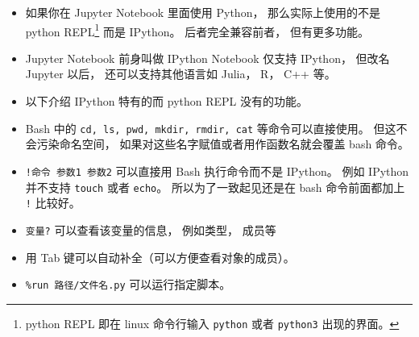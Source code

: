 
\begin{issues}
\issueDraft
\end{issues}

\begin{itemize}
\item 如果你在 Jupyter Notebook 里面使用 Python， 那么实际上使用的不是 python REPL\footnote{python REPL 即在 linux 命令行输入 \verb|python| 或者 \verb|python3| 出现的界面。} 而是 IPython。 后者完全兼容前者， 但有更多功能。
\item Jupyter Notebook 前身叫做 IPython Notebook 仅支持 IPython， 但改名 Jupyter 以后， 还可以支持其他语言如 Julia， R， C++ 等。
\item 以下介绍 IPython 特有的而 python REPL 没有的功能。
\item Bash 中的 \verb|cd, ls, pwd, mkdir, rmdir, cat| 等命令可以直接使用。 但这不会污染命名空间， 如果对这些名字赋值或者用作函数名就会覆盖 bash 命令。
\item \verb|!命令 参数1 参数2| 可以直接用 Bash 执行命令而不是 IPython。 例如 IPython 并不支持 \verb|touch| 或者 \verb|echo|。 所以为了一致起见还是在 bash 命令前面都加上 \verb|!| 比较好。
\item \verb|变量?| 可以查看该变量的信息， 例如类型， 成员等
\item 用 Tab 键可以自动补全（可以方便查看对象的成员）。
\item \verb|%run 路径/文件名.py| 可以运行指定脚本。
\end{itemize}
